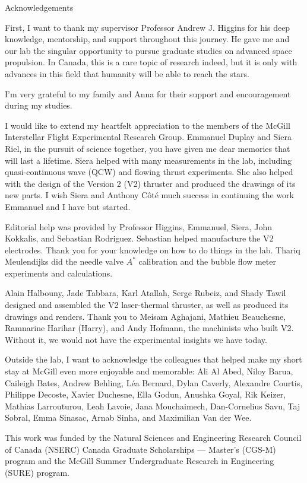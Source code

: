 \begin{plainchp}{Acknowledgements}
    
    First, I want to thank my supervisor Professor Andrew J. Higgins for his deep knowledge, mentorship, and support throughout this journey. He gave me and our lab the singular opportunity to pursue graduate studies on advanced space propulsion. In Canada, this is a rare topic of research indeed, but it is only with advances in this field that humanity will be able to reach the stars.

    I'm very grateful to my family and Anna for their support and encouragement during my studies.

    I would like to extend my heartfelt appreciation to the members of the McGill Interstellar Flight Experimental Research Group. Emmanuel Duplay and Siera Riel, in the pursuit of science together, you have given me dear memories that will last a lifetime. Siera helped with many measurements in the lab, including quasi-continuous wave (QCW) and flowing thrust experiments. She also helped with the design of the Version 2 (V2) thruster and produced the drawings of its new parts. I wish Siera and Anthony Côté much success in continuing the work Emmanuel and I have but started.

    Editorial help was provided by Professor Higgins, Emmanuel, Siera, John Kokkalis, and Sebastian Rodriguez. Sebastian helped manufacture the V2 electrodes. Thank you for your knowledge on how to do things in the lab. Thariq Meulendijks did the needle valve $A^*$ calibration and the bubble flow meter experiments and calculations.

    Alain Halbouny, Jade Tabbara, Karl Atallah, Serge Rubeiz, and Shady Tawil designed and assembled the V2 laser-thermal thruster, as well as produced its drawings and renders. Thank you to Meisam Aghajani, Mathieu Beauchesne, Ramnarine Harihar (Harry), and Andy Hofmann, the machinists who built V2. Without it, we would not have the experimental insights we have today.

    Outside the lab, I want to acknowledge the colleagues that helped make my short stay at McGill even more enjoyable and memorable: Ali Al Abed, Niloy Barua, Caileigh Bates, Andrew Behling, Léa Bernard, Dylan Caverly, Alexandre Courtis, Philippe Decoste, Xavier Duchesne, Ella Godun, Anushka Goyal, Rik Keizer, Mathias Larrouturou, Leah Lavoie, Jana Mouchaimech, Dan-Cornelius Savu, Taj Sobral, Emma Sinasac, Arnab Sinha, and Maximilian Van der Wee.

    This work was funded by the Natural Sciences and Engineering Research Council of Canada (NSERC) Canada Graduate Scholarships — Master's (CGS-M) program and the McGill Summer Undergraduate Research in Engineering (SURE) program.

\end{plainchp}